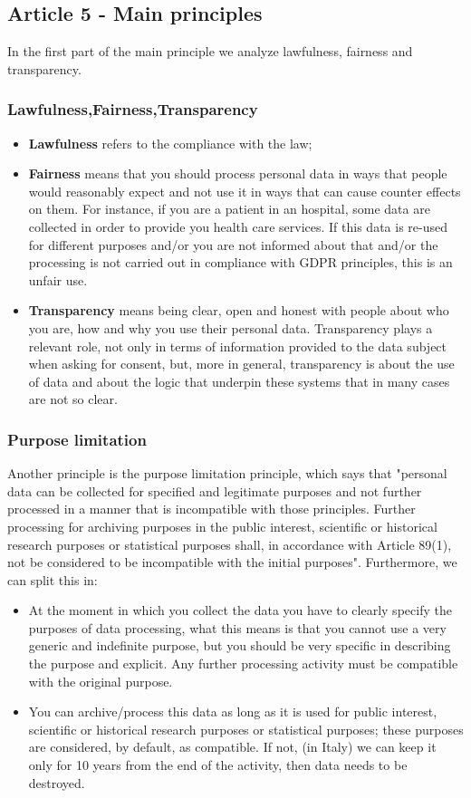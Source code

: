\subsection{Article 5 - Main principles}
In the first part of the main principle we analyze lawfulness, fairness and transparency.
\subsubsection{Lawfulness,Fairness,Transparency}
\begin{itemize}
    \item \textbf{Lawfulness} refers to the compliance with the law; 
    \item \textbf{Fairness} means that you should process personal data in ways that people would reasonably expect and not use it in ways that can cause counter effects on them. For instance, if you are a patient in an hospital, some data are collected in order to provide you health care services. If this data is re-used for different purposes and/or you are not informed about that and/or the processing is not carried out in compliance with GDPR principles, this is an unfair use.
    \item \textbf{Transparency} means being clear, open and honest with people about who you are, how and why you use their personal data.
    Transparency plays a relevant role, not only in terms of information provided to the data subject when asking for consent, but, more in general, transparency is about the use of data and about the logic that underpin these systems that in many cases are not so clear.
\end{itemize}

\subsubsection{Purpose limitation}
Another principle is the purpose limitation principle, which says that "personal data can be collected for specified and legitimate purposes and not further processed in a manner that is incompatible with those principles. Further processing for archiving purposes in the public interest, scientific or historical research purposes or statistical purposes shall, in accordance with Article 89(1), not be considered to be incompatible with the initial purposes".
Furthermore, we can split this in:
\begin{itemize}
    \item At the moment in which you collect the data you have to clearly specify the purposes of data processing, what this means is that you cannot use a very generic and indefinite purpose, but you should be very specific in describing the purpose and explicit. Any further processing activity must be compatible with the original purpose.
    \item You can archive/process this data as long as it is used for public interest, scientific or historical research purposes or statistical purposes; these purposes are considered, by default, as compatible. If not, (in Italy) we can keep it only for 10 years from the end of the activity, then data needs to be destroyed. 
\end{itemize}

